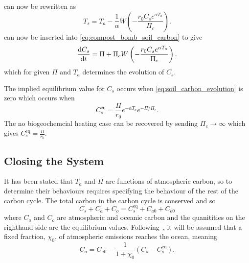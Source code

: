  can now be rewritten as
\begin{equation}
  \label{eq:soil_temperature_equilibrium_nppc}
  T_s = T_a - \frac{1}{\alpha} W\left(-\frac{r_0C_s e^{\alpha T_a}}{\Pi_c} \right).
\end{equation}
 can now be inserted into \cref{eq:compost_bomb_soil_carbon} to give
\begin{equation}
  \label{eq:soil_carbon_evolution}
  \dv{C_s}{t} = \Pi + \Pi_c W\left(-\frac{r_0C_s e^{\alpha T_a}}{\Pi_c} \right).
\end{equation}
which for given $\Pi$ and $T_a$ determines the evolution of $C_s$.

The implied equilibrium value for $C_s$ occurs when \cref{eq:soil_carbon_evolution} is zero which occurs when
\begin{equation}
  \label{eq:equilibirum_soil_carbon}
  C_s^{\mathrm{eq}} = \frac{\Pi}{r_0} e^{-\alpha T_a} e^{-\Pi/\Pi_c}.
\end{equation}
The no biogeochemcial heating case can be recovered by sending $\Pi_c \rightarrow \infty$ which gives $C_s^{\mathrm{eq}} = \frac{\Pi}{r_0}$.

\subsection{Closing the System}
It has been stated that $T_a$ and $\Pi$ are functions of atmospheric carbon, so to determine their behaviours requires specifying the behaviour of the rest of the carbon
cycle. The total carbon in the carbon cycle is conserved and so
\begin{equation}
  \label{eq:carbon_conservation}
  C_s + C_a + C_o = C_s^{\mathrm{eq}} + C_{a0} + C_{o0}
\end{equation}
where $C_a$ and $C_o$ are atmospheric and oceanic carbon and the quanitities on the righthand side are the equilibrium values.
Following~\cite{Cox2006}, it will be assumed that a fixed fraction, $\chi_0$, of atmospheric emissions reaches the ocean, meaning
\begin{equation}
  \label{eq:simple_ocean}
  C_a = C_{a0} -\frac{1}{1+\chi_0} (C_s - C_{s}^{\mathrm{eq}}).
\end{equation}

